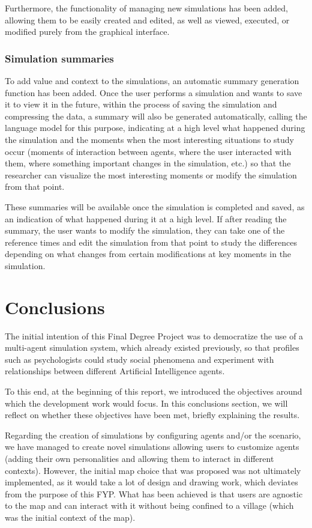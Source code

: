 Furthermore, the functionality of managing new simulations has been added, allowing them to be easily created and edited, as well as viewed, executed, or modified purely from the graphical interface.

\subsubsection*{Simulation summaries}

To add value and context to the simulations, an automatic summary generation function has been added. Once the user performs a simulation and wants to save it to view it in the future, within the process of saving the simulation and compressing the data, a summary will also be generated automatically, calling the language model for this purpose, indicating at a high level what happened during the simulation and the moments when the most interesting situations to study occur (moments of interaction between agents, where the user interacted with them, where something important changes in the simulation, etc.) so that the researcher can visualize the most interesting moments or modify the simulation from that point.

These summaries will be available once the simulation is completed and saved, as an indication of what happened during it at a high level. If after reading the summary, the user wants to modify the simulation, they can take one of the reference times and edit the simulation from that point to study the differences depending on what changes from certain modifications at key moments in the simulation.

\section*{Conclusions}

The initial intention of this Final Degree Project was to democratize the use of a multi-agent simulation system, which already existed previously, so that profiles such as psychologists could study social phenomena and experiment with relationships between different Artificial Intelligence agents.

To this end, at the beginning of this report, we introduced the objectives around which the development work would focus. In this conclusions section, we will reflect on whether these objectives have been met, briefly explaining the results.

Regarding the creation of simulations by configuring agents and/or the scenario, we have managed to create novel simulations allowing users to customize agents (adding their own personalities and allowing them to interact in different contexts). However, the initial map choice that was proposed was not ultimately implemented, as it would take a lot of design and drawing work, which deviates from the purpose of this FYP. What has been achieved is that users are agnostic to the map and can interact with it without being confined to a village (which was the initial context of the map).

